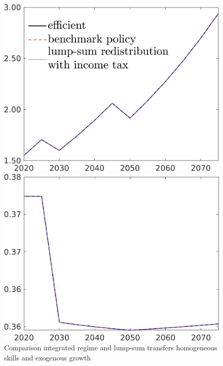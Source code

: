 \begin{figure}[h!!]
	\centering
	\caption{Comparison integrated regime and lump-sum transfers homogeneous skills and exogenous growth}\label{fig:bench_lumpsum_noskill_xgr}
	
	\begin{minipage}[]{0.32\textwidth}
		\includegraphics[width=1\textwidth]{../../codding_model/own_basedOnFried/optimalPol_190722_tidiedUp/figures/all_July22/C_CompEffOPT_T_NoTaus_pol4_spillover0_noskill1_sep1_xgrowth1_etaa0.79_lgd1_lff0.png}
	\end{minipage}
	\begin{minipage}[]{0.32\textwidth}
		\includegraphics[width=1\textwidth]{../../codding_model/own_basedOnFried/optimalPol_190722_tidiedUp/figures/all_July22/hh_CompEffOPT_T_NoTaus_pol4_spillover0_noskill1_sep1_xgrowth1_etaa0.79_lgd0_lff0.png}

\end{minipage}
\end{figure}
